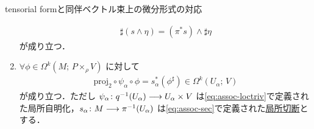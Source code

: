 \documentclass[TQFT_main]{subfiles}
\begin{document}
\begin{myprop}[label=prop:assoc-basic]{tensorial formと同伴ベクトル束上の微分形式の対応}
\begin{enumerate}
        \begin{align}
            \sharp (s \wedge \eta) = (\pi^* s)\wedge \sharp \eta
        \end{align}
        が成り立つ．
        \item 
        $\forall \phi \in \Omega^k (M;\, P \times_\rho V)$ に対して
        \begin{align}
            \mathrm{proj}_2 \circ \psi_\alpha \circ \phi = s_\alpha^* (\phi^\sharp) \in \Omega^k (U_\alpha;\, V)
        \end{align}
        が成り立つ．ただし $\psi_\alpha \colon q^{-1} (U_\alpha) \longrightarrow U_\alpha \times V$ は\eqref{eq:assoc-loctriv}で定義された局所自明化，$s_\alpha \colon M \longrightarrow \pi^{-1}(U_\alpha)$ は\eqref{eq:assoc-sec}で定義された\hyperref[def.section]{局所切断}とする．
    \end{enumerate}
\end{myprop}
\end{document}
